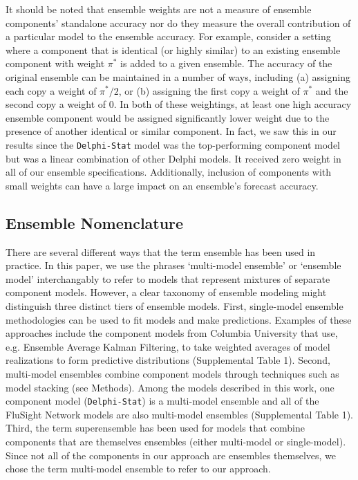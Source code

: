 \documentclass{article}\usepackage[]{graphicx}\usepackage[]{color}
\begin{document}
It should be noted that ensemble weights are not a measure of ensemble components' standalone accuracy nor do they measure the overall contribution of a particular model to the ensemble accuracy.
For example, consider a setting where a component that is identical (or highly similar) to an existing ensemble component with weight $\pi^*$ is added to a given ensemble. 
The accuracy of the original ensemble can be maintained in a number of ways, including (a) assigning each copy a weight of $\pi^*/2$, or (b) assigning the first copy a weight of $\pi^*$ and the second copy a weight of $0$. 
In both of these weightings, at least one high accuracy ensemble component would be assigned significantly lower weight due to the presence of another identical or similar component.
In fact, we saw this in our results since the {\tt Delphi-Stat} model was the top-performing component model but was a linear combination of other Delphi models.
It received zero weight in all of our ensemble specifications.
Additionally, inclusion of components with small weights can have a large impact on an ensemble's forecast accuracy.


\subsection*{Ensemble Nomenclature}

There are several different ways that the term ensemble has been used in practice. 
In this paper, we use the phrases `multi-model ensemble' or `ensemble model' interchangably to refer to models that represent mixtures of separate component models. 
However, a clear taxonomy of ensemble modeling might distinguish three distinct tiers of ensemble models. 
First, single-model ensemble methodologies can be used to fit models and make predictions. 
Examples of these approaches include the component models from Columbia University that use, e.g. Ensemble Average Kalman Filtering, to take weighted averages of model realizations to form predictive distributions (Supplemental Table 1).
Second, multi-model ensembles combine component models through techniques such as model stacking (see Methods).
Among the models described in this work, one component model ({\tt Delphi-Stat}) is a multi-model ensemble and all of the FluSight Network models are also multi-model ensembles (Supplemental Table 1).
Third, the term superensemble has been used for models that combine components that are themselves ensembles (either multi-model or single-model)\cite{krishnamurti1999improved,Yamana2016}.
Since not all of the components in our approach are ensembles themselves, we chose the term multi-model ensemble to refer to our approach.
\end{document}
